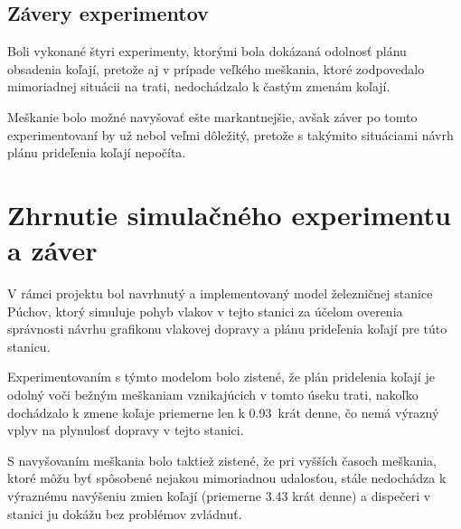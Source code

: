 \documentclass[12pt,a4paper,titlepage,final]{article}
\begin{document}
\subsection{Závery experimentov}

Boli vykonané štyri experimenty, ktorými bola dokázaná odolnosť plánu obsadenia koľají, pretože aj v prípade veľkého meškania, ktoré zodpovedalo mimoriadnej situácii
na trati, nedochádzalo k častým zmenám koľají.

Meškanie bolo možné navyšovať ešte markantnejšie, avšak záver po tomto experimentovaní by už nebol veľmi dôležitý, pretože s takýmito situáciami návrh plánu prideľenia koľají nepočíta.

\section{Zhrnutie simulačného experimentu a záver}

V rámci projektu bol navrhnutý a implementovaný model železničnej stanice Púchov,
ktorý simuluje pohyb vlakov v tejto stanici za účelom overenia správnosti návrhu grafikonu vlakovej
dopravy a plánu prideľenia koľají pre túto stanicu.

Experimentovaním s týmto modelom bolo zistené, že plán pridelenia koľají je odolný voči bežným meškaniam vznikajúcich v tomto úseku trati, nakoľko dochádzalo k zmene koľaje priemerne len k 0.93~krát denne, čo nemá výrazný vplyv na plynulosť dopravy v tejto stanici.

S navyšovaním meškania bolo taktiež zistené, že pri vyšších časoch meškania, ktoré môžu byť spôsobené
nejakou mimoriadnou udalosťou, stále nedochádza k výraznému navýšeniu zmien koľají (priemerne 3.43 krát denne) a dispečeri v stanici ju dokážu bez problémov zvládnuť.


\newpage



\begin{flushleft}
	
\end{flushleft}
\end{document}
